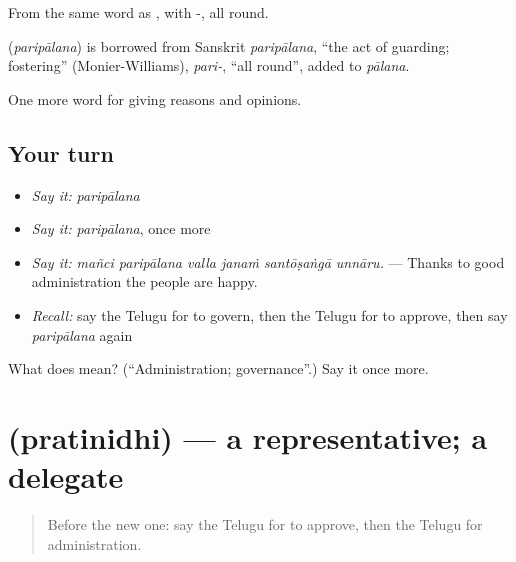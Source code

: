 From the same word as , with -, all round.

\begin{cousinweb}
\textbf{} (\emph{paripālana}) is borrowed from Sanskrit \emph{paripālana}, \textquotedblleft{}the act of guarding; fostering\textquotedblright{} (Monier-Williams), \emph{pari-}, \textquotedblleft{}all round\textquotedblright{}, added to \emph{pālana}.
\end{cousinweb}

\begin{grammarlens}[title={What you've built}]
One more word for giving reasons and opinions.
\end{grammarlens}

\subsection*{Your turn}
\begin{itemize}
\raggedright
  \item \emph{Say it:} \emph{paripālana}
  \item \emph{Say it:} \emph{paripālana}, once more
  \item \emph{Say it:} \emph{mañci paripālana valla janaṁ santōṣaṅgā unnāru.} — Thanks to good administration the people are happy.
  \item \emph{Recall:} say the Telugu for to govern, then the Telugu for to approve, then say \emph{paripālana} again
\end{itemize}

\begin{tcolorbox}[breakable,colback=teal!4,colframe=teal!35!black,title={Before you move on}]
What does  mean? (\textquotedblleft{}Administration; governance\textquotedblright{}.) Say it once more.
\end{tcolorbox}
\section[\texorpdfstring{\te{ప్రతినిధి} (pratinidhi)}{ప్రతినిధి (pratinidhi)}]{ (pratinidhi) — a representative; a delegate}

\label{lesson:TE-C403-pratinidhi}



\begin{quote}
Before the new one: say the Telugu for to approve, then the Telugu for administration.
\end{quote}

